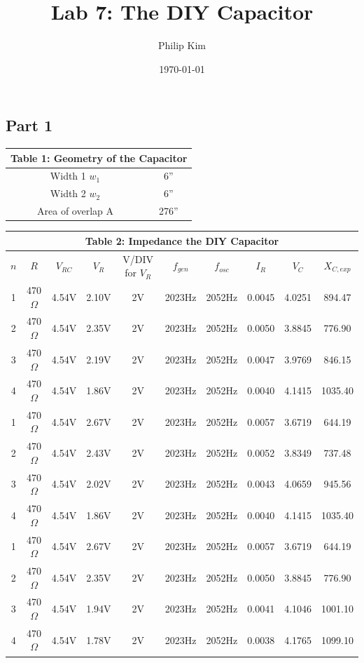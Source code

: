 \documentclass{article}
\title{Lab 7: The DIY Capacitor}
\author{Philip Kim}
\date{\today}
\begin{document}
\maketitle
\vspace*{-1cm}
\begin{table}[!htp]\centering
\subsection*{Part 1}
\begin{tabular}{|c|c|}\hline
  \multicolumn{2}{|c|}{\textbf{Table 1: Geometry of the Capacitor}} \\\hline
  Width 1 \(w_1\) & 6'' \\\hline
  Width 2 \(w_2\) & 6'' \\\hline
  Area of overlap A & 276'' \\\hline
  \end{tabular}
\end{table}

\begin{table}[!htp]\centering
  \begin{tabular}{|c|c|c|c|c|c|c|c|c|c|}\hline
    \multicolumn{10}{|c|}{\textbf{Table 2: Impedance the DIY Capacitor}} \\\hline
    \(n\) & \(R\) & \(V_{RC}\) & \(V_R\) & V/DIV for \(V_R\) & \(f_{gen}\) & \(f_{osc}\) & \(I_R\) & \(V_C\) & \(X_{C,exp}\) \\\hline
    1 & 470\(\Omega \) & 4.54V & 2.10V & 2V & 2023Hz & 2052Hz & 0.0045 & 4.0251 & 894.47 \\\hline
    2 & 470\(\Omega \) & 4.54V & 2.35V & 2V & 2023Hz & 2052Hz & 0.0050 & 3.8845 & 776.90 \\\hline
    3 & 470\(\Omega \) & 4.54V & 2.19V & 2V & 2023Hz & 2052Hz & 0.0047 & 3.9769 & 846.15 \\\hline
    4 & 470\(\Omega \) & 4.54V & 1.86V & 2V & 2023Hz & 2052Hz & 0.0040 & 4.1415 & 1035.40 \\\hline
    1 & 470\(\Omega \) & 4.54V & 2.67V & 2V & 2023Hz & 2052Hz & 0.0057 & 3.6719 & 644.19 \\\hline
    2 & 470\(\Omega \) & 4.54V & 2.43V & 2V & 2023Hz & 2052Hz & 0.0052 & 3.8349 & 737.48 \\\hline
    3 & 470\(\Omega \) & 4.54V & 2.02V & 2V & 2023Hz & 2052Hz & 0.0043 & 4.0659 & 945.56 \\\hline
    4 & 470\(\Omega \) & 4.54V & 1.86V & 2V & 2023Hz & 2052Hz & 0.0040 & 4.1415 & 1035.40 \\\hline
    1 & 470\(\Omega \) & 4.54V & 2.67V & 2V & 2023Hz & 2052Hz & 0.0057 & 3.6719 & 644.19 \\\hline
    2 & 470\(\Omega \) & 4.54V & 2.35V & 2V & 2023Hz & 2052Hz & 0.0050 & 3.8845 & 776.90 \\\hline
    3 & 470\(\Omega \) & 4.54V & 1.94V & 2V & 2023Hz & 2052Hz & 0.0041 & 4.1046 & 1001.10 \\\hline
    4 & 470\(\Omega \) & 4.54V & 1.78V & 2V & 2023Hz & 2052Hz & 0.0038 & 4.1765 & 1099.10 \\\hline
  \end{tabular}
\end{table}
\end{document}
